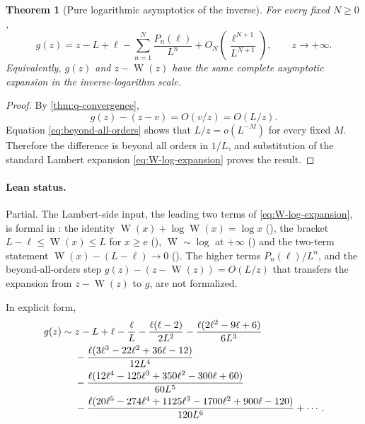 \documentclass[11pt,oneside]{article}
\theoremstyle{plain}
\newtheorem{theorem}{Theorem}[section]
\theoremstyle{definition}
\theoremstyle{remark}
\newcommand{\W}{\operatorname{W}}
\newcommand{\e}{\mathrm{e}}
\begin{document}
\begin{theorem}[Pure logarithmic asymptotics of the inverse]
\label{thm:pure-log}
For every fixed \(N\ge0\),
\begin{equation}
 g(z)=z-L+\ell-\sum_{n=1}^{N}\frac{P_n(\ell)}{L^n}
 +O_N\!\left(\frac{\ell^{N+1}}{L^{N+1}}\right),
 \qquad z\to+\infty.
 \label{eq:pure-log-truncated}
\end{equation}
Equivalently, \(g(z)\) and \(z-\W(z)\) have the same complete asymptotic
expansion in the inverse-logarithm scale.
\end{theorem}

\begin{proof}
By \cref{thm:q-convergence},
\[
 g(z)-(z-v)=O(v/z)=O(L/z).
\]
Equation \eqref{eq:beyond-all-orders} shows that \(L/z=o(L^{-M})\) for every
fixed \(M\).  Therefore the difference is beyond all orders in \(1/L\), and
substitution of the standard Lambert expansion \eqref{eq:W-log-expansion}
proves the result.
\end{proof}

\paragraph{Lean status.}
Partial.  The Lambert-side input, the leading two terms of \eqref{eq:W-log-expansion}, is
formal in : the identity \(\W(x)+\log\W(x)=\log x\)
(), the bracket \(L-\ell\le\W(x)\le L\) for \(x\ge\e\)
(), \(\W\sim\log\) at \(+\infty\)
() and the two-term statement
\(\W(x)-(L-\ell)\to0\) ().  The
higher terms \(P_n(\ell)/L^n\), and the beyond-all-orders step
\(g(z)-(z-\W(z))=O(L/z)\) that transfers the expansion from \(z-\W(z)\) to \(g\), are not
formalized.

In explicit form,
\begin{align}
 g(z)\sim{}&z-L+\ell-\frac{\ell}{L}
 -\frac{\ell(\ell-2)}{2L^2}
 -\frac{\ell(2\ell^2-9\ell+6)}{6L^3}\notag\\
 &-\frac{\ell(3\ell^3-22\ell^2+36\ell-12)}{12L^4}\notag\\
 &-\frac{\ell(12\ell^4-125\ell^3+350\ell^2-300\ell+60)}{60L^5}\notag\\
 &-\frac{\ell(20\ell^5-274\ell^4+1125\ell^3-1700\ell^2
   +900\ell-120)}{120L^6}+\cdots.
 \label{eq:pure-log-explicit}
\end{align}
\end{document}
